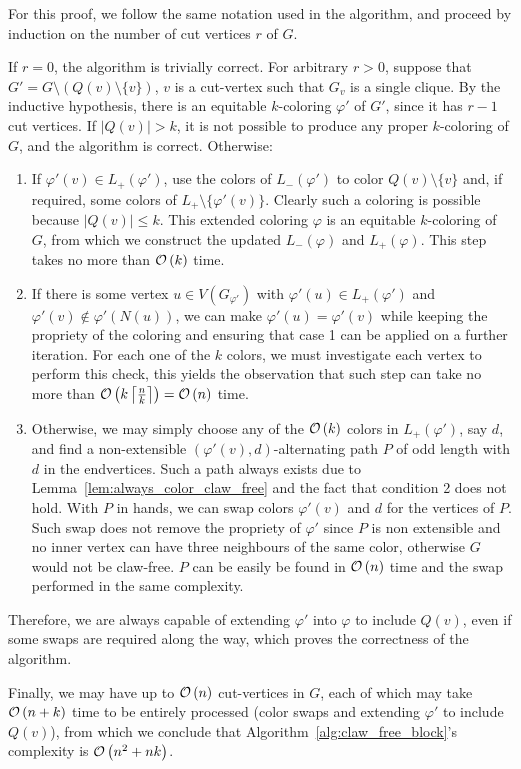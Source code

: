 \begin{tproof}
    For this proof, we follow the same notation used in the algorithm, and proceed by induction on the number of cut vertices $r$ of $G$.
    
    If $r = 0$, the algorithm is trivially correct. For arbitrary $r > 0$, suppose that $G' = G \setminus (Q(v) \setminus \{v\})$, $v$ is a cut-vertex such that $G_v$ is a single clique. By the inductive hypothesis, there is an equitable $k$-coloring $\varphi'$ of $G'$, since it has $r - 1$ cut vertices.
    If $|Q(v)| > k$, it is not possible to produce any proper $k$-coloring of $G$, and the algorithm is correct.
    Otherwise:
    \begin{enumerate}
        \item If $\varphi'(v) \in L_+(\varphi')$, use the colors of $L_-(\varphi')$ to color $Q(v) \setminus \{v\}$ and, if required, some colors of $L_+ \setminus \{\varphi'(v)\}$. Clearly such a coloring is possible because $|Q(v)| \leq k$. This extended coloring $\varphi$ is an equitable $k$-coloring of $G$, from which we construct the updated $L_-(\varphi)$ and $L_+(\varphi)$.
        This step takes no more than $\mathcal{O}\left(k\right)$ time.
        \item If there is some vertex $u \in V(G_{\varphi'})$ with $\varphi'(u) \in L_+(\varphi')$ and $\varphi'(v) \notin \varphi'(N(u))$, we can make $\varphi'(u) = \varphi'(v)$ while keeping the propriety of the coloring and ensuring that case 1 can be applied on a further iteration.
        For each one of the $k$ colors, we must investigate each vertex to perform this check, this yields the observation that such step can take no more than $\mathcal{O}\left(k\left\lceil\frac{n}{k}\right\rceil\right) = \mathcal{O}\left(n\right)$ time.
        \item Otherwise, we may simply choose any of the $\mathcal{O}\left(k\right)$ colors in $L_+(\varphi')$, say $d$, and find a non-extensible $(\varphi'(v), d)$-alternating path $P$ of odd length with $d$ in the endvertices.
        Such a path always exists due to Lemma~\ref{lem:always_color_claw_free} and the fact that condition 2 does not hold.
        With $P$ in hands, we can swap colors $\varphi'(v)$ and $d$ for the vertices of $P$. Such swap does not remove the propriety of $\varphi'$ since $P$ is non extensible and no inner vertex can have three neighbours of the same color, otherwise $G$ would not be claw-free.
        $P$ can be easily be found in $\mathcal{O}\left(n\right)$ time and the swap performed in the same complexity.
    \end{enumerate}
    
    Therefore, we are always capable of extending $\varphi'$ into $\varphi$ to include $Q(v)$, even if some swaps are required along the way, which proves the correctness of the algorithm.
    
    Finally, we may have up to $\mathcal{O}\left(n\right)$ cut-vertices in $G$, each of which may take $\mathcal{O}\left(n + k\right)$ time to be entirely processed (color swaps and extending $\varphi'$ to include $Q(v)$), from which we conclude that Algorithm~\ref{alg:claw_free_block}'s complexity is $\mathcal{O}\left(n^2 + nk\right)$.
\end{tproof}


